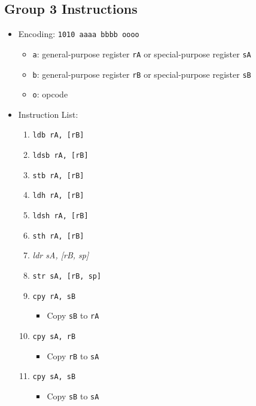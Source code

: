\documentclass{article}
\begin{document}
	\subsection{Group 3 Instructions}
		\begin{itemize}
		\item Encoding:  \texttt{1010 aaaa bbbb oooo}
			\begin{itemize}
			\item \texttt{a}:  general-purpose register \texttt{rA} or
				special-purpose register \texttt{sA}
			\item \texttt{b}:  general-purpose register \texttt{rB} or
				special-purpose register \texttt{sB}
			\item \texttt{o}:  opcode
			\end{itemize}
		\item Instruction List:
			\begin{enumerate}
			\item \texttt{ldb rA, [rB]}
			\item \texttt{ldsb rA, [rB]}
			\item \texttt{stb rA, [rB]}
			\item \texttt{ldh rA, [rB]}

			\item \texttt{ldsh rA, [rB]}
			\item \texttt{sth rA, [rB]}
			\item \textit{ldr sA, [rB, sp]}
			\item \texttt{str sA, [rB, sp]}


			\item \texttt{cpy rA, sB}
				\begin{itemize}
				\item Copy \texttt{sB} to \texttt{rA}
				\end{itemize}
			\item \texttt{cpy sA, rB}
				\begin{itemize}
				\item Copy \texttt{rB} to \texttt{sA}
				\end{itemize}
			\item \texttt{cpy sA, sB}
				\begin{itemize}
				\item Copy \texttt{sB} to \texttt{sA}
				\end{itemize}


\end{enumerate}
\end{itemize}
\end{document}
